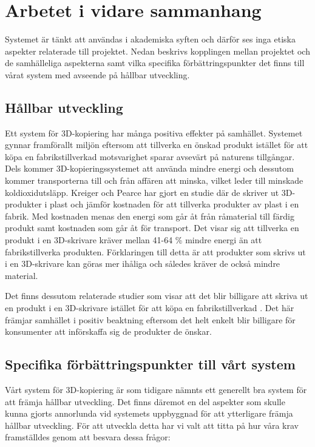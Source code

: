\section{Arbetet i vidare sammanhang}
\label{sec:work-wider-context}

Systemet är tänkt att användas i akademiska syften och därför ses inga etiska aspekter relaterade till projektet. Nedan beskrivs kopplingen mellan projektet och de samhälleliga aspekterna samt vilka specifika förbättringspunkter det finns till vårat system med avseende på hållbar utveckling.

\subsection{Hållbar utveckling}
\label{disc:hållbar_utveckling}
Ett system för 3D-kopiering har många positiva effekter på samhället. Systemet gynnar framförallt miljön eftersom att tillverka en önskad produkt istället för att köpa en fabrikstillverkad motsvarighet sparar avsevärt på naturens tillgångar. Dels kommer 3D-kopieringssystemet att använda mindre energi och dessutom kommer transporterna till och från affären att minska, vilket leder till minskade koldioxidutsläpp. Kreiger och Pearce  \cite{kreiger2013environmental} har gjort en studie där de skriver ut 3D-produkter i plast och jämför kostnaden för att tillverka produkter av plast i en fabrik. Med kostnaden menas den energi som går åt från råmaterial till färdig produkt samt kostnaden som går åt för transport. Det visar sig att tillverka en produkt i en 3D-skrivare kräver mellan 41-64 \% mindre energi än att fabrikstillverka produkten. Förklaringen till detta är att produkter som skrivs ut i en 3D-skrivare kan göras mer ihåliga och således kräver de också mindre material.

Det finns dessutom relaterade studier som visar att det blir billigare att skriva ut en produkt i en 3D-skrivare istället för att köpa en fabrikstillverkad \cite{wittbrodt2013life}. Det här främjar samhället i positiv beaktning eftersom det helt enkelt blir billigare för konsumenter att införskaffa sig de produkter de önskar.

\subsection{Specifika förbättringspunkter till vårt system}
Vårt system för 3D-kopiering är som tidigare nämnts ett generellt bra system för att främja hållbar utveckling. Det finns däremot en del aspekter som skulle kunna gjorts annorlunda vid systemets uppbyggnad för att ytterligare främja hållbar utveckling. För att utveckla detta har vi valt att titta på hur våra krav framställdes genom att besvara dessa frågor:

